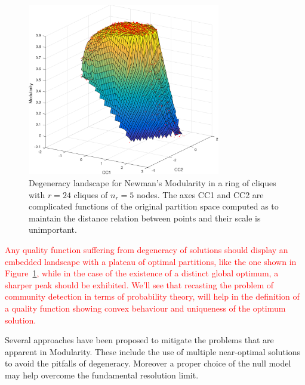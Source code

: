\begin{figure}[htb!]
\centering
\includegraphics[width=0.75\textwidth]{images/degeneracy_modularity.pdf}
\caption{Degeneracy landscape for Newman's Modularity in a ring of cliques with $r=24$ cliques of $n_r=5$ nodes. The axes CC1 and CC2 are complicated functions of the original partition space computed as to maintain the distance relation between points and their scale is unimportant.}
\label{fig:degeneracylandscape}
\end{figure}

\textcolor{red}{Any quality function suffering from degeneracy of solutions should display an embedded landscape with a plateau of optimal partitions, like the one shown in Figure~\ref{fig:degeneracylandscape}, while in the case of the existence of a distinct global optimum, a sharper peak should be exhibited.
We'll see that recasting the problem of community detection in terms of probability theory, will help in the definition of a quality function showing convex behaviour and uniqueness of the optimum solution.}

Several approaches have been proposed to mitigate the problems that are apparent in Modularity. These include the use of multiple near-optimal solutions to avoid the pitfalls of degeneracy. Moreover a proper choice of the null model may help overcome the fundamental resolution limit.

